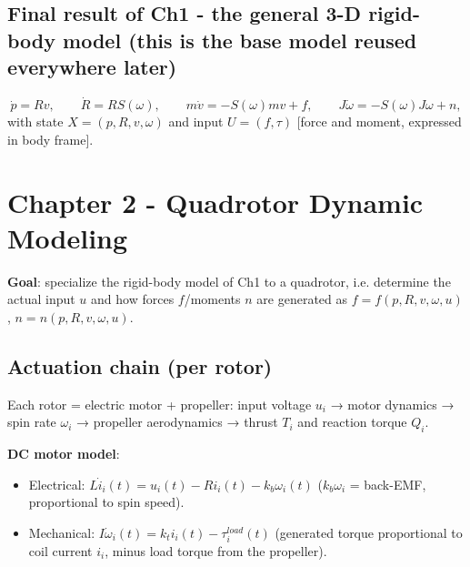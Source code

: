 \documentclass[11pt]{article}
\begin{document}
\subsection{Final result of Ch1 - the general 3-D rigid-body model (this is the base model reused everywhere later)}
\[
\dot p = Rv,\qquad \dot R = RS(\omega),\qquad m\dot v=-S(\omega)mv+f,\qquad J\dot\omega=-S(\omega)J\omega+n,
\]
with state $X=(p,R,v,\omega)$ and input $U=(f,\tau)$ [force and moment, expressed in body frame].

\section{Chapter 2 - Quadrotor Dynamic Modeling}

\textbf{Goal}: specialize the rigid-body model of Ch1 to a quadrotor, i.e. determine the actual input $u$ and how forces $f$/moments $n$ are generated as $f=f(p,R,v,\omega,u)$, $n=n(p,R,v,\omega,u)$.

\subsection{Actuation chain (per rotor)}
Each rotor = electric motor + propeller: input voltage $u_i$ → motor dynamics → spin rate $\omega_i$ → propeller aerodynamics → thrust $T_i$ and reaction torque $Q_i$.

\textbf{DC motor model}:
\begin{itemize}
\item Electrical: $L\dot i_i(t) = u_i(t) - Ri_i(t) - k_b\omega_i(t)$ ($k_b\omega_i$ = back-EMF, proportional to spin speed).
\item Mechanical: $I\dot\omega_i(t) = k_ti_i(t) - \tau_i^{load}(t)$ (generated torque proportional to coil current $i_i$, minus load torque from the propeller).
\end{itemize}
\end{document}
